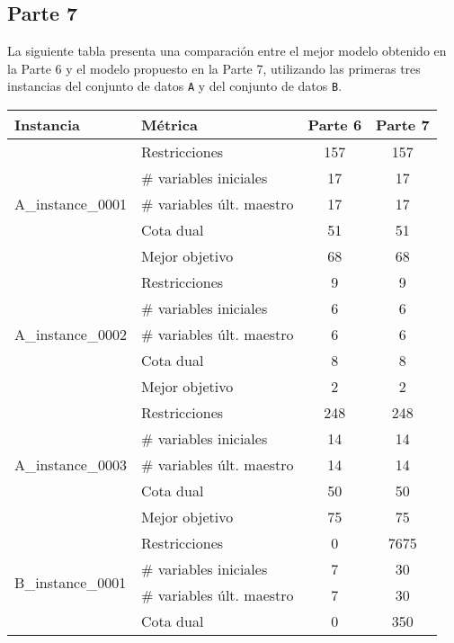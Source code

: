 \documentclass[a4paper,12pt]{article}
\begin{document}
\subsection{Parte 7}
La siguiente tabla presenta una comparación entre el mejor modelo obtenido en la Parte 6 y el modelo propuesto en la Parte 7, utilizando las primeras tres instancias del conjunto de datos \texttt{A} y del conjunto de datos \texttt{B}.

\begin{table}[h!]
\centering
\renewcommand{\arraystretch}{1.2}
\begin{tabularx}{\textwidth}{lXcc}
\toprule
\textbf{Instancia} & \textbf{Métrica} & \textbf{Parte 6} & \textbf{Parte 7} \\
\midrule
\multirow{5}{*}{A\_instance\_0001} 
  & Restricciones               & 157   & 157   \\
  & \# variables iniciales      & 17  & 17   \\
  & \# variables últ. maestro   & 17  & 17  \\
  & Cota dual                   & 51  & 51  \\
  & Mejor objetivo              & 68   & 68  \\
\midrule
\multirow{5}{*}{A\_instance\_0002} 
  & Restricciones               & 9   & 9  \\
  & \# variables iniciales      & 6   & 6   \\
  & \# variables últ. maestro   & 6   & 6   \\
  & Cota dual                   & 8   & 8   \\
  & Mejor objetivo              & 2   & 2   \\
\midrule
\multirow{5}{*}{A\_instance\_0003} 
  & Restricciones               & 248   & 248   \\
  & \# variables iniciales      & 14   & 14 \\
  & \# variables últ. maestro   & 14   & 14   \\
  & Cota dual                   & 50   & 50   \\
  & Mejor objetivo              & 75   & 75   \\
\midrule
\multirow{5}{*}{B\_instance\_0001} 
  & Restricciones               & 0   & 7675   \\
  & \# variables iniciales      & 7   & 30   \\
  & \# variables últ. maestro   & 7   & 30   \\
  & Cota dual                   & 0   & 350   \\

\end{tabularx}
\end{table}
\end{document}
